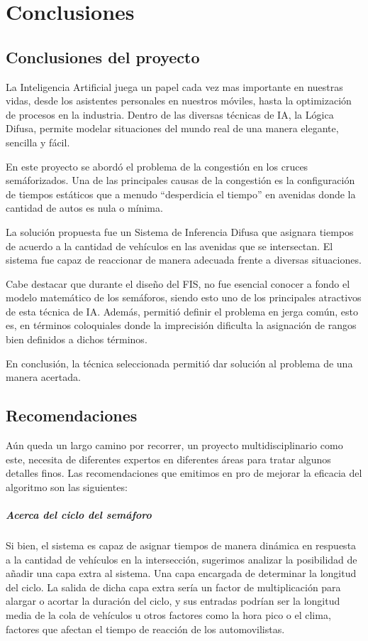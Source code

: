 \chapter{Conclusiones}

\section{Conclusiones del proyecto}
La Inteligencia Artificial juega un papel cada vez mas importante en nuestras vidas, desde los asistentes personales en nuestros móviles, hasta la optimización de procesos en la industria. Dentro de las diversas técnicas de IA, la Lógica Difusa, permite modelar situaciones del mundo real de una manera elegante, sencilla y fácil.

En este proyecto se abordó el problema de la congestión en los cruces semáforizados. Una de las principales causas de la congestión es la configuración de tiempos estáticos que a menudo ``desperdicia el tiempo'' en avenidas donde la cantidad de autos es nula o mínima.

La solución propuesta fue un Sistema de Inferencia Difusa que asignara tiempos de acuerdo a la cantidad de vehículos en las avenidas que se intersectan. El sistema fue capaz de reaccionar de manera adecuada frente a diversas situaciones. 

Cabe destacar que durante el diseño del FIS, no fue esencial conocer a fondo el modelo matemático de los semáforos, siendo esto uno de los principales atractivos de esta técnica de IA. Además, permitió definir el problema en jerga común, esto es, en términos coloquiales donde la imprecisión dificulta la asignación de rangos bien definidos a dichos términos.

En conclusión, la técnica seleccionada permitió dar solución al problema de una manera acertada. 
\section{Recomendaciones}
Aún queda un largo camino por recorrer, un proyecto multidisciplinario como este, necesita de diferentes expertos en diferentes áreas para tratar algunos detalles finos. Las recomendaciones que emitimos en pro de mejorar la eficacia del algoritmo son las siguientes:

\paragraph{Acerca del ciclo del semáforo}
Si bien, el sistema es capaz de asignar tiempos de manera dinámica en respuesta a la cantidad de vehículos en la intersección, sugerimos analizar la posibilidad de añadir una capa extra al sistema. Una capa encargada de determinar la longitud del ciclo. La salida de dicha capa extra sería un factor de multiplicación para alargar o acortar la duración del ciclo, y sus entradas podrían ser la longitud media de la cola de vehículos u otros factores como la hora pico o el clima, factores que afectan el tiempo de reacción de los automovilistas.

